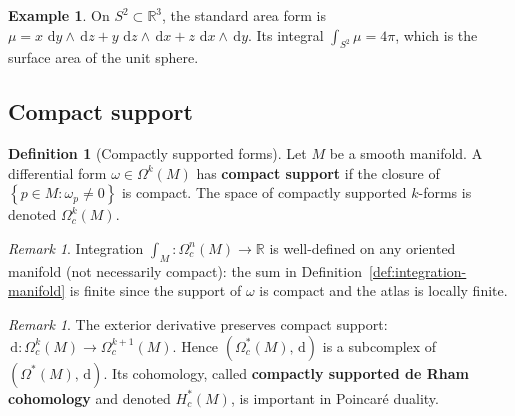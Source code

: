 \documentclass[12pt,a4paper,openany]{book}
\theoremstyle{definition}
\newtheorem{definition}[theorem]{Definition}
\newtheorem{example}[theorem]{Example}
\theoremstyle{remark}
\newtheorem{remark}[theorem]{Remark}
\newcommand{\R}{\mathbb{R}}
\newcommand{\dd}{\,\mathrm{d}}
\newcommand{\set}[1]{\left\{ #1 \right\}}
\begin{document}
\begin{example}\label{ex:integration-S2}
On $S^2 \subset \R^3$, the standard area form is
$\mu = x\,\dd y \wedge \dd z + y\,\dd z \wedge \dd x + z\,\dd x \wedge \dd y$.
Its integral $\int_{S^2} \mu = 4\pi$, which is the surface area of the
unit sphere.
\end{example}

\subsection{Compact support}\label{subsec:compact-support}

\begin{definition}[Compactly supported forms]\label{def:compact-support-forms}
Let $M$ be a smooth manifold. A differential form $\omega \in \Omega^k(M)$
has \textbf{compact support} if the closure of
$\set{p \in M : \omega_p \neq 0}$ is compact. The space of compactly
supported $k$-forms is denoted $\Omega_c^k(M)$.
\end{definition}

\begin{remark}\label{rem:compact-support-integration}
Integration $\int_M \colon \Omega_c^n(M) \to \R$ is well-defined on any
oriented manifold (not necessarily compact): the sum in
Definition~\ref{def:integration-manifold} is finite since the support of
$\omega$ is compact and the atlas is locally finite.
\end{remark}

\begin{remark}\label{rem:compact-support-complex}
The exterior derivative preserves compact support:
$\dd \colon \Omega_c^k(M) \to \Omega_c^{k+1}(M)$. Hence
$(\Omega_c^*(M), \dd)$ is a subcomplex of $(\Omega^*(M), \dd)$. Its
cohomology, called \textbf{compactly supported de Rham cohomology}%
 and denoted
$H_c^*(M)$, is important in Poincar\'e duality.
\end{remark}
\end{document}
